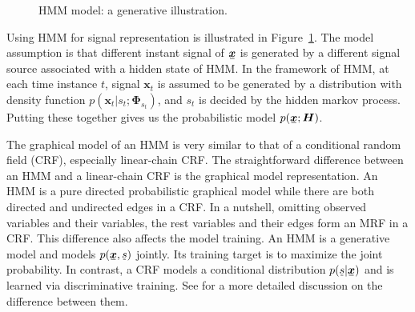 \begin{figure}[!t]
  \centering
  \caption{HMM model: a generative illustration.}\label{fig:hmm}
\end{figure}


Using HMM for signal representation is illustrated in Figure~\ref{fig:hmm}. The model assumption is that different instant signal of $\ubar{\bm{x}}$ is generated by a different signal source associated with a hidden state of HMM.
In the framework of HMM, at each time instance $t$, signal $\bm{x}_t$ is assumed to be generated by a distribution with density function $p(\bm{x}_t| s_t; \bm{\Phi}_{s_t})$, and $s_t$ is decided by the hidden markov process. Putting these together gives us the probabilistic model $p(\ubm{x};\bm{H})$.

\begin{remark}
The graphical model of an HMM is very similar to that of a conditional random field (CRF), especially linear-chain CRF. The straightforward difference between an HMM and a linear-chain CRF is the graphical model representation. An HMM is a pure directed probabilistic graphical model while there are both directed and undirected edges in a CRF. In a nutshell, omitting observed variables and their variables, the rest variables and their edges form an MRF in a CRF. This difference also affects the model training. An HMM is a generative model and models $p(\ubar{\bm{x}}, \ubar{{s}})$ jointly. Its training target is to maximize the joint probability. In contrast, a CRF models a conditional distribution $p(\ubar{{s}}|\ubar{\bm{x}})$ and is learned via discriminative training. See \cite{charles2012crf} for a more detailed discussion on the difference between them.
\end{remark}

